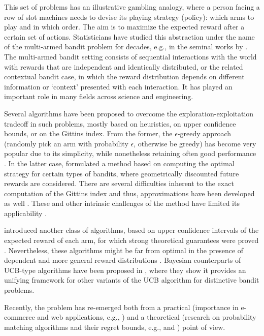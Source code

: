 \documentclass{article}
\newcommand{\eg}{e.g., }
\begin{document}
This set of problems has an illustrative gambling analogy, where a person facing a row of slot machines needs to devise its playing strategy (policy): which arms to play and in which order. The aim is to maximize the expected reward after a certain set of actions. Statisticians have studied this abstraction under the name of the multi-armed bandit problem for decades, e.g., in the seminal works by \citet{j-Robbins1952,j-Robbins1956}. The multi-armed bandit setting consists of sequential interactions with the world with rewards that are independent and identically distributed, or the related contextual bandit case, in which the reward distribution depends on different information or `context' presented with each interaction. It has played an important role in many fields across science and engineering.

Several algorithms have been proposed to overcome the exploration-exploitation tradeoff in such problems, mostly based on heuristics, on upper confidence bounds, or on the Gittins index. From the former, the $\epsilon$-greedy approach (randomly pick an arm with probability $\epsilon$, otherwise be greedy) has become very popular due to its simplicity, while nonetheless retaining often good performance \cite{j-Auer2002}. In the latter case, \citet{j-Gittins1979} formulated a method based on computing the optimal strategy for certain types of bandits, where geometrically discounted future rewards are considered. There are several difficulties inherent to the exact computation of the Gittins index and thus, approximations have been developed as well \cite{j-Brezzi2002}. These and other intrinsic challenges of the method have limited its applicability \cite{b-Sutton1998}.

\citet{j-Lai1985} introduced another class of algorithms, based on upper confidence intervals of the expected reward of each arm, for which strong theoretical guarantees were proved \cite{j-Lai1987}. Nevertheless, these algorithms might be far from optimal in the presence of dependent and more general reward distributions \cite{j-Scott2010}. Bayesian counterparts of UCB-type algorithms have been proposed in \cite{ip-Kaufmann2012}, where they show it provides an unifying framework for other variants of the UCB algorithm for distinctive bandit problems.

Recently, the problem has re-emerged both from a practical (importance in e-commerce and web applications, \eg \cite{j-Li2010}) and a theoretical (research on probability matching algorithms and their regret bounds, \eg \cite{j-Agrawal2011} and \cite{ip-Maillard2011}) point of view.
\end{document}
